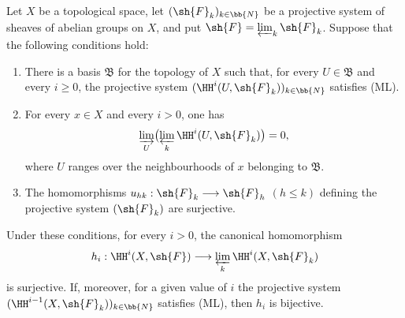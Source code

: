 \begin{proposition}[13.3.1]
\label{0.13.3.1}
Let $X$ be a topological space, let
$(\sh{F}_k)_{k\in\bb{N}}$ be a projective system of sheaves of
abelian groups on $X$, and put
$\sh{F}=\varprojlim_k\sh{F}_k$.
Suppose that the following conditions hold:
\begin{enumerate}
  \item[{\rm(i)}]
  There is a basis $\mathfrak{B}$ for the topology of $X$ such that,
  for every $U\in\mathfrak{B}$ and every $i\geq0$, the projective
  system
  $(\HH^i(U,\sh{F}_k))_{k\in\bb{N}}$ satisfies (ML).

  \item[{\rm(ii)}]
  For every $x\in X$ and every $i>0$, one has
  \[
    \varinjlim_U\bigl(\varprojlim_k
    \HH^i(U,\sh{F}_k)\bigr)=0,
  \]
  where $U$ ranges over the neighbourhoods of $x$ belonging to
  $\mathfrak{B}$.

  \item[{\rm(iii)}]
  The homomorphisms
  $u_{hk}:\sh{F}_k\longrightarrow\sh{F}_h$ $(h\leq k)$ defining the
  projective system $(\sh{F}_k)$ are surjective.
\end{enumerate}
Under these conditions, for every $i>0$, the canonical homomorphism
\[
  h_i:\HH^i(X,\sh{F})
  \longrightarrow
  \varprojlim_k\HH^i(X,\sh{F}_k)
\]
is surjective. If, moreover, for a given value of $i$ the projective
system
$(\HH^{i-1}(X,\sh{F}_k))_{k\in\bb{N}}$ satisfies (ML), then $h_i$ is
bijective.
\end{proposition}

